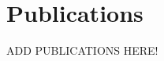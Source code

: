 \documentclass[11pt,a4paper,sans]{moderncv}        %
\begin{document}
\section{Publications}
ADD PUBLICATIONS HERE!

\end{document}
